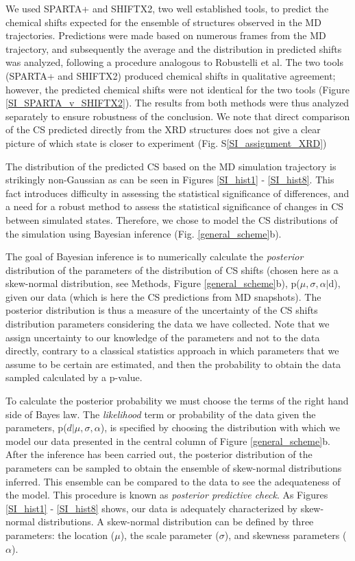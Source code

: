 \documentclass[%
 aip,
 amsmath,amssymb,
 preprint,%
]{revtex4-1}
\begin{document}
We used SPARTA+\cite{Shen2010}
and SHIFTX2,\cite{Han2011} two well established tools, to predict the chemical shifts expected for the ensemble of structures observed in the MD trajectories. Predictions were made based on numerous frames from the MD trajectory, and subsequently the average and the distribution in predicted shifts was analyzed, following a procedure analogous to Robustelli et al.\cite{Robustelli2012} The two tools (SPARTA+ and SHIFTX2) produced chemical shifts in qualitative agreement; however, the predicted chemical shifts were not identical for the two tools (Figure \ref{SI_SPARTA_v_SHIFTX2}). The results from both methods were thus analyzed separately to ensure robustness of the conclusion. We note that direct comparison of the CS predicted directly from the XRD structures does not give a clear picture of which state is closer to experiment (Fig. S\ref{SI_assignment_XRD})

The distribution of the predicted CS based on the MD simulation trajectory is strikingly non-Gaussian as can be seen in Figures \ref{SI_hist1} - \ref{SI_hist8}. This fact  introduces difficulty in  assessing the statistical significance of differences, and a need for a robust method to assess the statistical significance of changes in CS between simulated states. Therefore, we chose to model the CS distributions of the simulation using Bayesian inference (Fig. \ref{general_scheme}b). 

The goal of Bayesian inference is to numerically calculate the \textit{posterior} distribution of the parameters of the distribution of CS shifts (chosen here as a skew-normal distribution, see Methods, Figure \ref{general_scheme}b), p($\mu,\sigma,\alpha \vert $d), given our data (which is here the CS predictions from MD snapshots). The posterior distribution is thus a measure of the uncertainty of the CS shifts distribution parameters considering the data we have collected. Note that we assign uncertainty to our knowledge of the parameters and not to the data directly, contrary to a classical statistics approach in which parameters that we assume to be certain are estimated, and then the probability to obtain the data sampled calculated by a p-value. 

To calculate the posterior probability we must choose the terms of the right hand side of Bayes law. The \textit{likelihood} term or probability of the data given the parameters, p($d \vert \mu,\sigma,\alpha$), is specified by choosing the distribution with which we model our data presented in the central column of Figure \ref{general_scheme}b. After the inference has been carried out, the posterior distribution of the parameters can be sampled to obtain the ensemble of skew-normal distributions inferred. This ensemble can be compared to the data to see the adequateness of the model. This procedure is known as \textit{posterior predictive check}. As Figures \ref{SI_hist1} - \ref{SI_hist8} shows, our data is adequately characterized by skew-normal distributions. A skew-normal distribution can be defined by three parameters: the location ($\mu$), the scale parameter ($\sigma$), and skewness parameters ($\alpha$).
\end{document}
